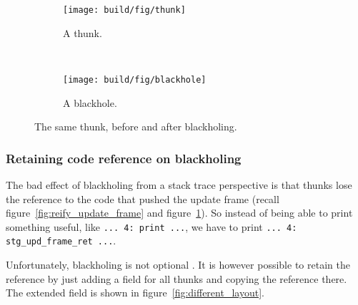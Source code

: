 \begin{figure}
\begin{mdframed}
  \begin{subfigure}[t]{0.5\textwidth}
    \texttt{[image: build/fig/thunk]}
    \caption{A thunk.}
  \end{subfigure}
        ~ %
  \begin{subfigure}[t]{0.5\textwidth}
    \texttt{[image: build/fig/blackhole]}
    \caption{A blackhole.}
  \end{subfigure}
  \caption{The same thunk, before and after blackholing.}\label{fig:thunks_and_blackholes}
\end{mdframed}
\end{figure}

\subsubsection{Retaining code reference on blackholing}

The bad effect of blackholing from a stack trace perspective is
that thunks lose the reference to the code that pushed the update frame (recall figure~\ref{fig:reify_update_frame} and figure~\ref{fig:thunks_and_blackholes}). So instead
of being able to print something useful, like  \texttt{... 4: print ...},
we have to print \texttt{... 4: stg\_upd\_frame\_ret ...}.

Unfortunately, blackholing is not optional
\cite{github_blackholing_not_optional}. It is however possible to
retain the reference by just adding a field for all thunks and
copying the reference there. The extended field is shown in figure~\ref{fig:different_layout}.

\begin{figure}
\end{figure}

